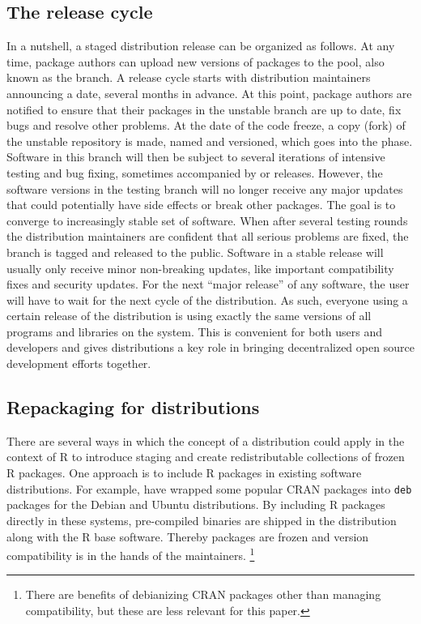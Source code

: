 \subsection{The release cycle}

In a nutshell, a staged distribution release can be organized as follows. At any
time, package authors can upload new versions of packages to the 
pool, also known as the  branch. A release cycle starts with
distribution maintainers announcing a  date, several
months in advance. At this point, package authors are notified to ensure
that their packages in the unstable branch are up to date, fix bugs and resolve
other problems. At the date of the code freeze, a copy (fork) of the unstable
repository is made, named and versioned, which goes into the 
phase. Software in this branch will then be subject to several iterations of
intensive testing and bug fixing, sometimes accompanied by  or
 releases. However, the software versions in the testing branch will
no longer receive any major updates that could potentially have side effects
or break other packages. The goal is to converge to increasingly stable set of
software. When after several testing rounds the distribution maintainers are
confident that all serious problems are fixed, the branch is tagged 
and released to the public. Software in a stable release will usually only
receive minor non-breaking updates, like important compatibility fixes and
security updates. For the next ``major release'' of any software, the user will
have to wait for the next cycle of the distribution. As such, everyone using a
certain release of the distribution is using exactly the same versions of all programs
and libraries on the system. This is convenient for both users and developers
and gives distributions a key role in bringing decentralized open source
development efforts together.

\subsection{Repackaging for distributions}

There are several ways in which the concept of a distribution could apply in
the context of R to introduce staging and create redistributable collections
of frozen R packages. One approach is to include R packages in existing software
distributions. For example, \citet{cran2deb} have wrapped some popular CRAN
packages into \texttt{deb} packages for the Debian and Ubuntu distributions.
By including R packages directly in these systems, pre-compiled
binaries are shipped in the distribution along with the R base software. Thereby
packages are frozen and version compatibility is in the hands of the maintainers.
\footnote{There are benefits of debianizing CRAN packages other than managing
compatibility, but these are less relevant for this paper.}


